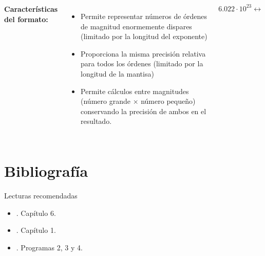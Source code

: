 \documentclass[9pt, aspectratio=169]{beamer}
\begin{document}
\begin{frame}
\begin{columns}[t]
\cx
\textbf{Características del formato:}
\begin{itemize}
    \item Permite representar números de órdenes de magnitud enormemente dispares (limitado por la longitud del exponente)
    \item Proporciona la misma precisión relativa para todos los órdenes (limitado por la longitud de la mantisa)
    \item Permite cálculos entre magnitudes (número grande $\times$ número pequeño) conservando la precisión de ambos en el resultado.
\end{itemize}

\begin{center}
    $6.022 \cdot 10^{23} \longleftrightarrow$ 
\end{center}

\cx


\end{columns}
\end{frame}

\section*{Bibliografía}
\begin{frame}[allowframebreaks]{Lecturas recomendadas}
\begin{itemize}
 \item {}. Capítulo 6.
 \item {}. Capítulo 1.
 \item {}. Programas 2, 3 y 4.
\end{itemize}
\end{frame}
\end{document}
